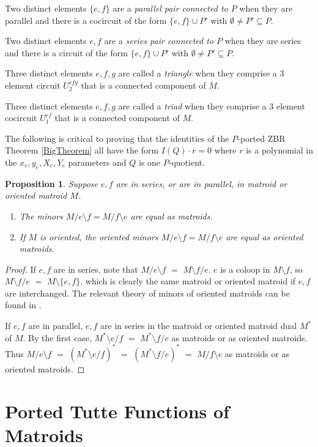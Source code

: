 \documentclass[12pt,leqno]{amsart}
\newtheorem{prop}[lem]{Proposition}
\theoremstyle{remark}
\begin{document}
Two distinct elements $\{e,f\}$  are a \emph{parallel pair connected
to $P$} when they are parallel and there is a cocircuit of the form
$\{e,f\}\cup P'$ with $\emptyset\neq P'\subseteq P$.

Two distinct elements $e,f$ are a \emph{series pair connected
to $P$} when they are series and there is a circuit of the form
$\{e,f\}\cup P'$ with $\emptyset\neq P'\subseteq P$.

Three distinct elements $e,f,g$ are called a \emph{triangle}
when they comprise a 3 element circuit $U_2^{efg}$ that is a 
connected component of $M$.

Three distinct elements $e,f,g$ are called a \emph{triad}
when they comprise a 3 element cocircuit $U_1^{ef}$ that is a 
connected component of $M$.

The following is critical to proving
that the identities of the $P$-ported ZBR Theorem \ref{BigTheorem}
all have the form
$I(Q)\cdot r=0$ where $r$ is a polynomial in the $x_e,y_e,X_e,Y_e$
parameters and $Q$ is one $P$-quotient.

\begin{prop}
\label{SameMinorProp}
Suppose $e,f$ are in series, or are in parallel, in matroid or
oriented matroid $M$.
\begin{enumerate}
\item The minors $M/e\setminus f=M/f\setminus e$
are equal as matroids.
\item If $M$ is oriented, the oriented minors 
$M/e\setminus f=M/f\setminus e$ are equal as oriented matroids.
\end{enumerate}
\end{prop}

\begin{proof}
If $e,f$ are in series, note that $M/e\setminus f$ $=$
$M\setminus f/e$.  $e$ is a coloop in $M\setminus f$,
so $M\setminus f/e$ $=$ $M\setminus\{e,f\}$, which is
clearly the same matroid or oriented matroid if $e,f$
are interchanged.  The relevant theory of minors of oriented matroids
can be found in \cite{OMBOOK}.

If $e,f$ are in parallel, $e,f$ are in series in 
the matroid or oriented matroid dual $M^*$ of $M$.
By the first case, $M^*\setminus e/ f$ $=$
$M^*\setminus f/e$ as matroids or as oriented matroids.
Thus $M/e\setminus f$ $=$ $(M^*\setminus e/ f)^*$ $=$
$(M^*\setminus f/ e)^*$ $=$ $M/f\setminus e$ as matroids or
as oriented matroids.
\end{proof}


\part{Ported Tutte Functions of Matroids}
\end{document}
